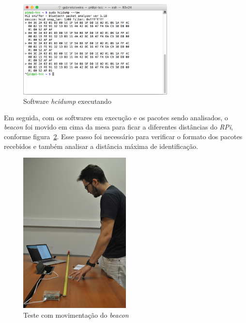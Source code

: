 \documentclass[
		12pt,				%
		openright,			%
		oneside,			%
		a4paper,			%
		chapter=TITLE,		%
		english,			%
		brazil				%
	]{abntex2}
\begin{document}
\begin{figure}[htb]
	\caption{\label{fig:hcidump}Software \textit{hcidump} executando}
	\begin{center}
		\includegraphics[width=0.7\textwidth]{img/hcidump.png}
	\end{center}
\end{figure}

Em seguida, com os softwares em execução e os pacotes sendo analisados, o \textit{beacon} foi movido em cima da mesa para ficar a diferentes distâncias do \textit{RPi}, conforme figura~\ref{fig:movimenta-beacon}. Esse passo foi necessário para verificar o formato dos pacotes recebidos e também analisar a distância máxima de identificação.

\begin{figure}[htb]
	\caption{\label{fig:movimenta-beacon}Teste com movimentação do \textit{beacon}}
	\begin{center}
		\includegraphics[width=0.5\textwidth]{img/ambiente4.jpg}
	\end{center}
\end{figure}
\end{document}
